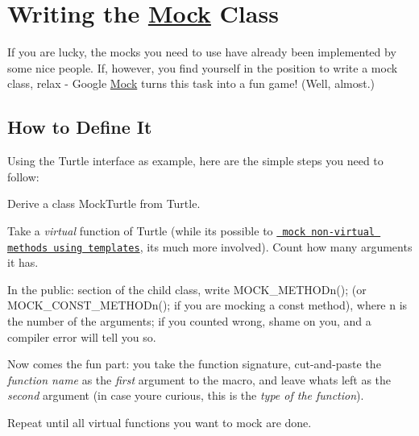 \section*{Writing the \mbox{\hyperlink{class_mock}{Mock}} Class}

If you are lucky, the mocks you need to use have already been implemented by some nice people. If, however, you find yourself in the position to write a mock class, relax -\/ Google \mbox{\hyperlink{class_mock}{Mock}} turns this task into a fun game! (Well, almost.)

\subsection*{How to Define It}

Using the {\ttfamily Turtle} interface as example, here are the simple steps you need to follow\+:


\begin{DoxyEnumerate}
\item Derive a class {\ttfamily Mock\+Turtle} from {\ttfamily Turtle}.
\end{DoxyEnumerate}
\begin{DoxyEnumerate}
\item Take a {\itshape virtual} function of {\ttfamily Turtle} (while it\textquotesingle{}s possible to \href{CookBook.md#mocking-nonvirtual-methods}\texttt{ mock non-\/virtual methods using templates}, it\textquotesingle{}s much more involved). Count how many arguments it has.
\end{DoxyEnumerate}
\begin{DoxyEnumerate}
\item In the {\ttfamily public\+:} section of the child class, write {\ttfamily M\+O\+C\+K\+\_\+\+M\+E\+T\+H\+O\+Dn();} (or {\ttfamily M\+O\+C\+K\+\_\+\+C\+O\+N\+S\+T\+\_\+\+M\+E\+T\+H\+O\+Dn();} if you are mocking a {\ttfamily const} method), where {\ttfamily n} is the number of the arguments; if you counted wrong, shame on you, and a compiler error will tell you so.
\end{DoxyEnumerate}
\begin{DoxyEnumerate}
\item Now comes the fun part\+: you take the function signature, cut-\/and-\/paste the {\itshape function name} as the {\itshape first} argument to the macro, and leave what\textquotesingle{}s left as the {\itshape second} argument (in case you\textquotesingle{}re curious, this is the {\itshape type of the function}).
\end{DoxyEnumerate}
\begin{DoxyEnumerate}
\item Repeat until all virtual functions you want to mock are done.
\end{DoxyEnumerate}

